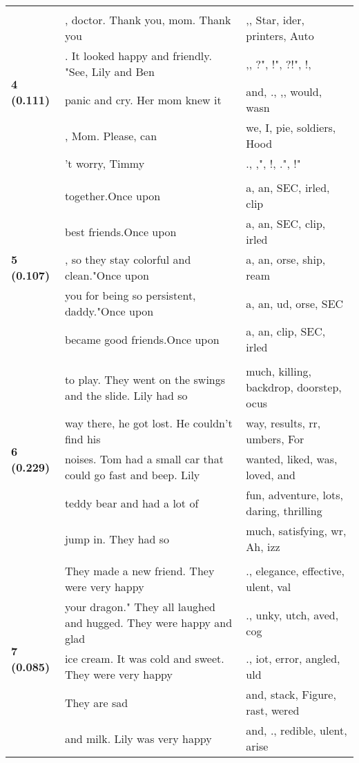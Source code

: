\documentclass{article}
\begin{document}
\begin{longtable}{|p{}|p{}|p{}|}
& & \\
\multirow{5}{*}{\textbf{4 (0.111)}} & , doctor. Thank you, mom. Thank you & ,,  Star, ider,  printers,  Auto \\
& . It looked happy and friendly.  "See, Lily and Ben & ,, ?", !", ?!", !, \\
& panic and cry. Her mom knew it & and, ., ,,  would,  wasn \\
& , Mom. Please, can & we,  I,  pie,  soldiers,  Hood \\
& 't worry, Timmy & ., ,", !, .", !" \\
& & \\
\multirow{5}{*}{\textbf{5 (0.107)}} & together.Once upon & a,  an, SEC, irled, clip \\
& best friends.Once upon & a,  an, SEC, clip, irled \\
& , so they stay colorful and clean."Once upon & a,  an, orse, ship, ream \\
& you for being so persistent, daddy."Once upon & a,  an, ud, orse, SEC \\
& became good friends.Once upon & a,  an, clip, SEC, irled \\
& & \\
\multirow{5}{*}{\textbf{6 (0.229)}} & to play. They went on the swings and the slide. Lily had so & much,  killing,  backdrop,  doorstep, ocus \\
& way there, he got lost. He couldn't find his & way,  results, rr, umbers, For \\
& noises. Tom had a small car that could go fast and beep. Lily & wanted,  liked,  was,  loved,  and \\
& teddy bear and had a lot of & fun,  adventure,  lots,  daring,  thrilling \\
& jump in. They had so & much,  satisfying, wr, Ah, izz \\
& & \\
\multirow{5}{*}{\textbf{7 (0.085)}} & They made a new friend. They were very happy & .,  elegance, effective, ulent, val \\
& your dragon."  They all laughed and hugged. They were happy and glad & ., unky, utch, aved,  cog \\
& ice cream. It was cold and sweet. They were very happy & ., iot,  error, angled, uld \\
& They are sad & and, stack, Figure, rast, wered \\
& and milk. Lily was very happy & and, ., redible, ulent,  arise \\

\end{longtable}
\end{document}
